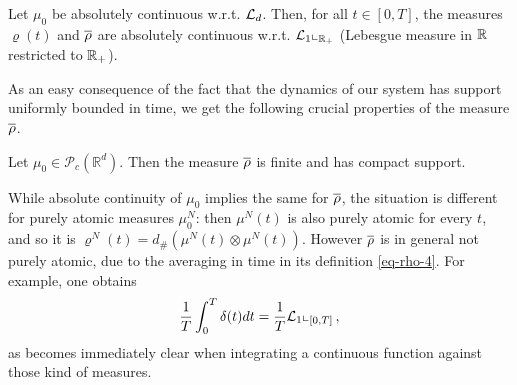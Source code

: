%

\begin{lemma}\label{le-abs}
	Let $\mu_0$ be absolutely continuous w.r.t. $\mathcal{L}_d$. Then, for all $t\in [0,T]$, the measures $\varrho(t)$ and $\overline\rho$ are absolutely
	continuous w.r.t. $\mathcal{L}_1\llcorner_{\mathbb{R}_+}$ (Lebesgue measure in $\mathbb{R}$ restricted to $\mathbb{R}_+$).
\end{lemma}

As an easy consequence of the fact that the dynamics of our system has support uniformly bounded in time, we get the following crucial properties of the measure $\overline\rho$.

\begin{lemma}\label{rhocompact} Let $\mu_0 \in \mathcal P_c(\mathbb R^d)$. Then
	the measure $\overline\rho$ is finite and has compact support.
\end{lemma}

\begin{remark}
	While absolute continuity of $\mu_0$ implies the same for $\overline\rho$, the situation is different for purely atomic
	measures $\mu_0^N$: then $\mu^N(t)$ is also purely atomic for every $t$, and so it is
	$\varrho^N(t) = d_\# (\mu^N(t) \otimes \mu^N(t))$. However $\overline\rho$ is in general not purely atomic, due to the averaging in time in its definition \eqref{eq-rho-4}. 
	For
	example, one obtains
	\begin{align*}
		\frac{1}{T}\int_0^T\delta(t) dt=\frac{1}{T}\mathcal{L}_1\llcorner_{[0,T]}\,,
	\end{align*}
	as becomes immediately clear when integrating a continuous function against those kind of measures.
\end{remark}



